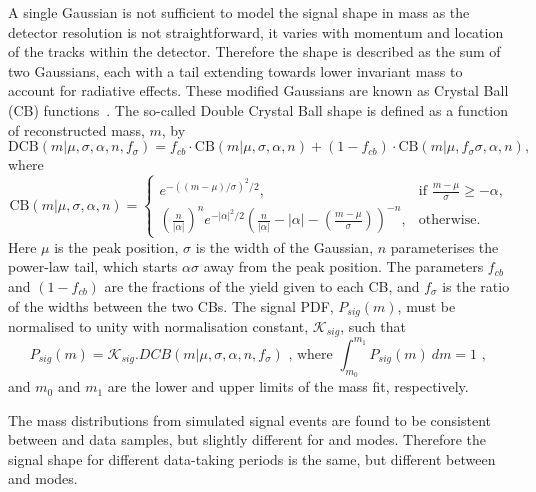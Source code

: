 A single Gaussian is not sufficient to model the signal shape in \Bm mass as the detector resolution is not straightforward, it varies with momentum and location of the tracks within the detector. Therefore the shape is described as the sum of two Gaussians, each with a tail extending towards lower invariant mass to account for radiative effects. These modified Gaussians are known as Crystal Ball (CB) functions~\cite{Skwarnicki:1986xj}. The so-called Double Crystal Ball shape is defined as a function of reconstructed mass, $m$, by
\begin{equation}
\mathrm{DCB}(m| \mu,\sigma,\alpha,n,f_{\sigma}) = f_{cb} \cdot \mathrm{CB}(m| \mu,\sigma,\alpha,n) + (1-f_{cb}) \cdot \mathrm{CB}(m|\mu,f_{\sigma}\sigma,\alpha,n),
\label{DCBshape}
\end{equation}
where
\begin{equation*}
  \mathrm{CB}(m| \mu,\sigma,\alpha,n)=
\begin{cases}
    e^{-((m-\mu)/ \sigma)^2/2},                                   & \text{if } \frac{m-\mu}{\sigma} \geq - \alpha, \\
   \left ( \frac{n}{|\alpha|} \right ) ^n e^{-|\alpha|^2/2} \left ( \frac{n}{|\alpha|} - |\alpha| - \left ( \frac{m-\mu}{\sigma} \right ) \right ) ^{-n} ,    & \text{otherwise.}
\end{cases}
\end{equation*}
Here $\mu$ is the peak position, $\sigma$ is the width of the Gaussian, $n$ parameterises the power-law tail, which starts $\alpha\sigma$ away from the peak position. The parameters $f_{cb}$ and $(1-f_{cb})$ are the fractions of the yield given to each CB, and $f_{\sigma}$ is the ratio of the widths between the two CBs. The signal PDF, $P_{sig}(m)$, must be normalised to unity with normalisation constant, $\mathcal{K}_{sig}$, such that
\begin{equation}
P_{sig}(m) = \mathcal{K}_{sig} . DCB(m| \mu,\sigma,\alpha,n,f_{\sigma}) \text{ ,	where } \int_{m_0}^{m_1} P_{sig}(m)\ dm = 1 \text{ , }
\end{equation}
and $m_0$ and $m_1$ are the lower and upper limits of the mass fit, respectively.

The \Bm mass distributions from simulated signal events are found to be consistent between \runone and \runtwo data samples, but slightly different for \kpi and \kpipipi modes. Therefore the signal shape for different data-taking periods is the same, but different between \kpi and \kpipipi modes. 

